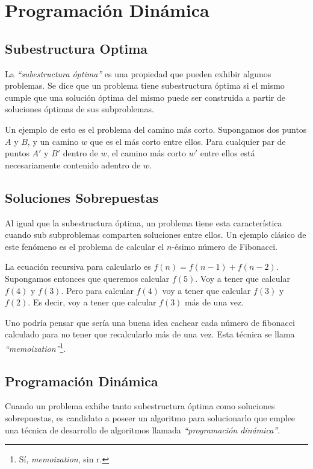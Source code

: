 \newpage
\section{Programaci\'on Din\'amica}

\subsection{Subestructura Optima}

La \emph{``subestructura \'optima''} es una propiedad que pueden exhibir algunos problemas. Se dice que un problema tiene subestructura \'optima si el mismo cumple que una soluci\'on \'optima del mismo puede ser construida a partir de soluciones \'optimas de sus subproblemas.

Un ejemplo de esto es el problema del camino m\'as corto. Supongamos dos puntos $A$ y $B$, y un camino $w$ que es el m\'as corto entre ellos. Para cualquier par de puntos $A'$  y $B'$ dentro de $w$, el camino m\'as corto $w'$ entre ellos est\'a necesariamente contenido adentro de $w$.

\subsection{Soluciones Sobrepuestas}

Al igual que la subestructura \'optima, un problema tiene esta caracter\'istica cuando sub subproblemas comparten soluciones entre ellos. Un ejemplo cl\'asico de este fen\'omeno es el problema de calcular el $n$-\'esimo n\'umero de Fibonacci.

La ecuaci\'on recursiva para calcularlo es $f(n) = f(n-1) + f(n-2)$. Supongamos entonces que queremos calcular $f(5)$. Voy a tener que calcular $f(4)$ y $f(3)$. Pero para calcular $f(4)$ voy a tener que calcular $f(3)$ y $f(2)$. Es decir, voy a tener que calcular $f(3)$ m\'as de una vez.

Uno podr\'ia pensar que ser\'ia una buena idea cachear cada n\'umero de fibonacci calculado para no tener que recalcularlo m\'as de una vez. Esta t\'ecnica se llama \emph{``memoization''}\footnote{S\'i, \emph{memoization}, sin r.}.  

\subsection{Programaci\'on Din\'amica}

Cuando un problema exhibe tanto subestructura \'optima como soluciones sobrepuestas, es candidato a poseer un algoritmo para solucionarlo que emplee una t\'ecnica de desarrollo de algoritmos llamada \emph{``programaci\'on din\'amica''}.

